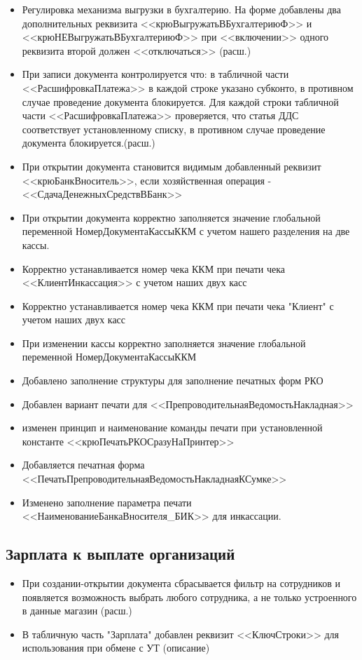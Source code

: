 \begin{itemize}
	\item  Регулировка механизма выгрузки в бухгалтерию. На форме добавлены два дополнительных реквизита <<крюВыгружатьВБухгалтериюФ>> и <<крюНЕВыгружатьВБухгалтериюФ>> при <<включении>> одного реквизита второй должен <<отключаться>>
	(расш.)
	\item При записи документа контролируется что: в табличной части <<РасшифровкаПлатежа>> в каждой строке указано субконто, в противном случае проведение документа блокируется. Для каждой строки табличной части <<РасшифровкаПлатежа>> проверяется, что статья ДДС соответствует установленному списку, в противном случае проведение документа блокируется.(расш.)
	\item При открытии документа становится видимым добавленный реквизит <<крюБанкВноситель>>, если хозяйственная операция - <<СдачаДенежныхСредствВБанк>>
	\item При открытии документа корректно заполняется значение глобальной переменной НомерДокументаКассыККМ
	с учетом нашего разделения на две кассы.
	\item Корректно устанавливается номер чека ККМ при печати чека <<КлиентИнкассация>>  с учетом наших двух касс
	\item Корректно устанавливается номер чека ККМ при печати чека "Клиент"  с учетом наших двух касс
	\item При изменении кассы корректно заполняется значение глобальной переменной НомерДокументаКассыККМ
	\item Добавлено заполнение структуры для заполнение печатных форм РКО
	\item Добавлен вариант печати для <<ПрепроводительнаяВедомостьНакладная>>
	\item изменен принцип и наименование команды печати при установленной константе <<крюПечатьРКОСразуНаПринтер>>
	\item Добавляется печатная форма <<ПечатьПрепроводительнаяВедомостьНакладнаяКСумке>>
	\item Изменено заполнение параметра печати <<НаименованиеБанкаВносителя\_БИК>> для инкассации.


\end{itemize}



\subsection{Зарплата к выплате организаций}
\begin{itemize}
     \item При создании-открытии документа сбрасывается фильтр на сотрудников и появляется возможность выбрать любого сотрудника, а не только устроенного в данные магазин (расш.)
	 \item В табличную часть "Зарплата" добавлен реквизит <<КлючСтроки>> для использования при обмене с УТ
	 	(описание)

\end{itemize}

